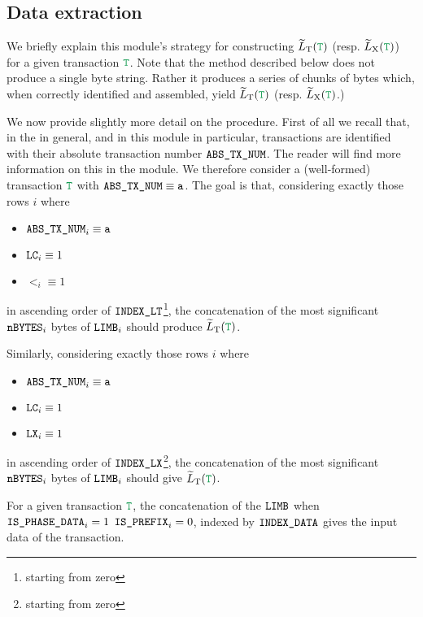 \subsection{Data extraction}

We briefly explain this module's strategy for constructing $\locLtTildeOfT$ (resp. $\locLxTildeOfT$) for a given transaction $\locTransaction$.
Note that the method described below does not produce a single byte string.
Rather it produces a series of chunks of bytes which, when correctly identified and assembled, yield $\locLtTildeOfT$ (resp. $\locLxTildeOfT$.)

We now provide slightly more detail on the procedure.
First of all we recall that, in the \zkEvm{} in general, and in this module in particular, transactions are identified with their absolute transaction number $\texttt{ABS\_TX\_NUM}$.
The reader will find more information on this in the \userTxnDataMod{} module.
We therefore consider a (well-formed) transaction $\locTransaction$ with $\texttt{ABS\_TX\_NUM} \equiv \texttt{a}$.
The goal is that, considering exactly those rows $i$ where
\begin{multicols}{3}
	\begin{itemize}
		\item $\texttt{ABS\_TX\_NUM}_{i} \equiv \texttt{a}$
		\item $\texttt{LC}_{i} \equiv 1$
		\item $\lt_{i} \equiv 1$
	\end{itemize}
\end{multicols}
\noindent in ascending order of $\texttt{INDEX\_LT}$\footnote{starting from zero},
the concatenation of the most significant 
$\texttt{nBYTES} _{i}$ bytes of $\texttt{LIMB} _{i}$ should produce $\locLtTildeOfT$.

Similarly, considering exactly those rows $i$ where
\begin{multicols}{3}
	\begin{itemize}
		\item $\texttt{ABS\_TX\_NUM}_{i} \equiv \texttt{a}$
		\item $\texttt{LC}_{i} \equiv 1$
		\item $\texttt{LX}_{i} \equiv 1$
	\end{itemize}
\end{multicols}
\noindent in ascending order of $\texttt{INDEX\_LX}$\footnote{starting from zero},
the concatenation of the most significant 
$\texttt{nBYTES} _{i}$ bytes of $\texttt{LIMB} _{i}$ should give $\locLtTildeOfT$.

\saNote{} For a given transaction $\locTransaction$,
the concatenation of the
$\texttt{LIMB}$ when
$\texttt{IS\_PHASE\_DATA}_{i}=1$ \et{}
$\texttt{IS\_PREFIX}_{i}=0$, indexed by
$\texttt{INDEX\_DATA}$ gives the input data of the transaction.
